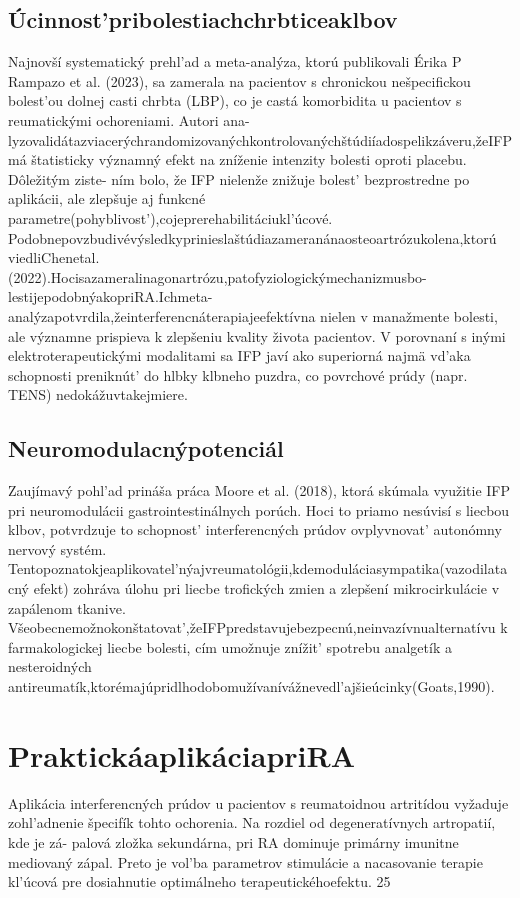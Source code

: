 \subsection{Úcinnost’pribolestiachchrbticeaklbov}

Najnovší systematický prehl’ad a meta-analýza, ktorú publikovali Érika P Rampazo et al. (2023), sa zamerala na pacientov s chronickou nešpecifickou bolest’ou dolnej casti chrbta (LBP), co je castá komorbidita u pacientov s reumatickými ochoreniami. Autori ana- lyzovalidátazviacerýchrandomizovanýchkontrolovanýchštúdiíadospelikzáveru,žeIFP má štatisticky významný efekt na zníženie intenzity bolesti oproti placebu. Dôležitým ziste- ním bolo, že IFP nielenže znižuje bolest’ bezprostredne po aplikácii, ale zlepšuje aj funkcné parametre(pohyblivost’),cojeprerehabilitáciukl’úcové. Podobnepovzbudivévýsledkyprinieslaštúdiazameranánaosteoartrózukolena,ktorú viedliChenetal.(2022).Hocisazameralinagonartrózu,patofyziologickýmechanizmusbo- lestijepodobnýakopriRA.Ichmeta-analýzapotvrdila,žeinterferencnáterapiajeefektívna nielen v manažmente bolesti, ale významne prispieva k zlepšeniu kvality života pacientov. V porovnaní s inými elektroterapeutickými modalitami sa IFP javí ako superiorná najmä vd’aka schopnosti preniknút’ do hlbky klbneho puzdra, co povrchové prúdy (napr. TENS) nedokážuvtakejmiere.


\subsection{Neuromodulacnýpotenciál}

Zaujímavý pohl’ad prináša práca Moore et al. (2018), ktorá skúmala využitie IFP pri neuromodulácii gastrointestinálnych porúch. Hoci to priamo nesúvisí s liecbou klbov, potvrdzuje to schopnost’ interferencných prúdov ovplyvnovat’ autonómny nervový systém. Tentopoznatokjeaplikovatel’nýajvreumatológii,kdemoduláciasympatika(vazodilatacný efekt) zohráva úlohu pri liecbe trofických zmien a zlepšení mikrocirkulácie v zapálenom tkanive. Všeobecnemožnokonštatovat’,žeIFPpredstavujebezpecnú,neinvazívnualternatívu k farmakologickej liecbe bolesti, cím umožnuje znížit’ spotrebu analgetík a nesteroidných antireumatík,ktorémajúpridlhodobomužívanívážnevedl’ajšieúcinky(Goats,1990).


\section{PraktickáaplikáciapriRA}

Aplikácia interferencných prúdov u pacientov s reumatoidnou artritídou vyžaduje zohl’adnenie špecifík tohto ochorenia. Na rozdiel od degeneratívnych artropatií, kde je zá- palová zložka sekundárna, pri RA dominuje primárny imunitne mediovaný zápal. Preto je vol’ba parametrov stimulácie a nacasovanie terapie kl’úcová pre dosiahnutie optimálneho terapeutickéhoefektu. 25



